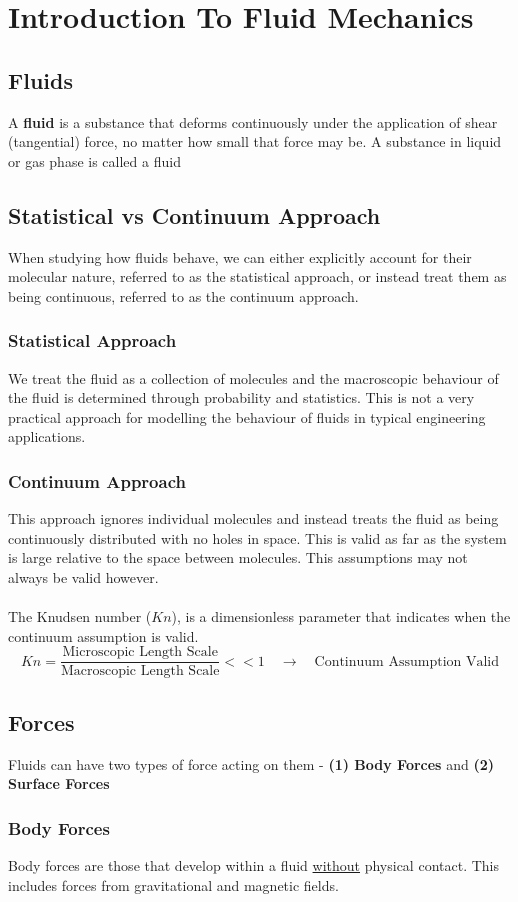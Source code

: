 \documentclass[11pt]{article}
\begin{document}
\section{Introduction To Fluid Mechanics}
\subsection{Fluids}
A \textbf{fluid} is a substance that deforms continuously under the application of shear (tangential) force, no matter how small that force may be. A substance in liquid or gas phase is called a fluid
\subsection{Statistical vs Continuum Approach}
When studying how fluids behave, we can either explicitly account for their molecular nature, referred to as the statistical approach, or instead treat them as being continuous, referred to as the continuum approach.
\subsubsection{Statistical Approach}
We treat the fluid as a collection of molecules and the macroscopic behaviour of the fluid is determined through probability and statistics. This is not a very practical approach for modelling the behaviour of fluids in typical engineering applications.
\subsubsection{Continuum Approach}
This approach ignores individual molecules and instead treats the fluid as being continuously distributed with no holes in space. This is valid as far as the system is large relative to the space between molecules. This assumptions may not always be valid however.
\\ \\ 
The Knudsen number ($Kn$), is a dimensionless parameter that indicates when the continuum assumption is valid.
$$ Kn = \frac{\text{Microscopic Length Scale}}{\text{Macroscopic Length Scale}} << 1 \quad  \rightarrow \quad \text{Continuum Assumption Valid}$$
\subsection{Forces}
Fluids can have two types of force acting on them - \textbf{(1) Body Forces} and \textbf{(2) Surface Forces}
\subsubsection{Body Forces}
Body forces are those that develop within a fluid \underline{without} physical contact. This includes forces from gravitational and magnetic fields.
\end{document}
